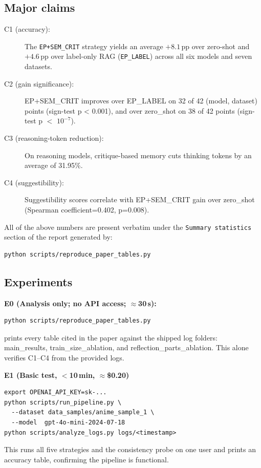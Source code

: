 \subsection{Major claims}
\label{sec:claims}
\begin{description}
\item[C1 (accuracy):] The \texttt{EP+SEM\_CRIT} strategy
yields an average $+8.1$\,pp over zero-shot and $+4.6$\,pp over
label-only RAG (\texttt{EP\_LABEL}) across all six models and seven datasets.
\item[C2 (gain significance):] EP+SEM\_CRIT improves over EP\_LABEL on 32 of 42 (model, dataset) points (sign-test p < 0.001), and over zero\_shot on 38 of 42 points (sign-test p $<$ $10^{-7}$).
\item[C3 (reasoning-token reduction):] On reasoning models, critique-based memory cuts thinking tokens by an average of 31.95\%.
\item[C4 (suggestibility):] Suggestibility scores correlate with EP+SEM\_CRIT gain over zero\_shot (Spearman coefficient=0.402, p=0.008).
\end{description}


All of the above numbers are present verbatim under the \texttt{Summary statistics} section of the report generated by:
\begin{verbatim}
python scripts/reproduce_paper_tables.py
\end{verbatim}

\subsection{Experiments}

\noindent\textbf{E0 (Analysis only; no API access; $\approx$30\,s):}
\begin{verbatim}
python scripts/reproduce_paper_tables.py
\end{verbatim}
prints every table cited in the paper against the shipped log folders: main\_results, train\_size\_ablation, and reflection\_parts\_ablation.
This alone verifies C1--C4 from the provided logs.

\noindent\textbf{E1 (Basic test, $<$10\,min, $\approx$\$0.20)}
\begin{verbatim}
export OPENAI_API_KEY=sk-...
python scripts/run_pipeline.py \
  --dataset data_samples/anime_sample_1 \
  --model  gpt-4o-mini-2024-07-18
python scripts/analyze_logs.py logs/<timestamp>
\end{verbatim}
This runs all five strategies and the consistency probe on one user and
prints an accuracy table, confirming the pipeline is functional.

